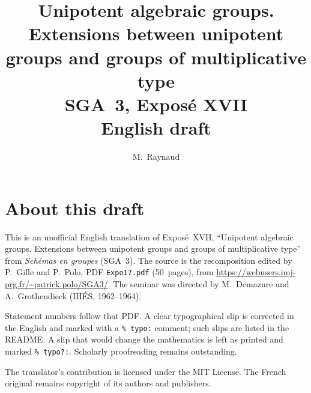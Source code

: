 \documentclass[11pt,a4paper,oneside]{amsbook}
\title[SGA~3, Expos\'e XVII (English draft)]{Unipotent algebraic groups. Extensions between unipotent groups and groups of multiplicative type\\
{\normalsize SGA~3, Expos\'e XVII\\English draft}}
\author{M.\ Raynaud}
\date{}
\begin{document}
\frontmatter
\maketitle

\chapter*{About this draft}
This is an unofficial English translation of Expos\'e~XVII, ``Unipotent algebraic groups. Extensions between unipotent groups and groups of multiplicative type''
from \textit{Sch\'emas en groupes} (SGA~3).
The source is the recomposition edited by P.~Gille and P.~Polo,
PDF \texttt{Expo17.pdf} (50~pages),
from \url{https://webusers.imj-prg.fr/~patrick.polo/SGA3/}.
The seminar was directed by M.~Demazure and A.~Grothendieck
(IH\'ES, 1962--1964).

Statement numbers follow that PDF. A clear typographical slip is
corrected in the English and marked with a \texttt{\% typo:} comment;
such slips are listed in the README. A slip that would change the
mathematics is left as printed and marked \texttt{\% typo?:}.
Scholarly proofreading remains outstanding.

The translator's contribution is licensed under the MIT License.
The French original remains copyright of its authors and publishers.

\tableofcontents
\mainmatter








\end{document}
